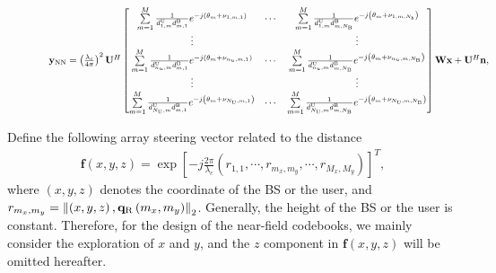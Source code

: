 \documentclass[lettersize, journal]{IEEEtran}
\begin{document}
\begin{figure*}[!b]
\hrulefill
\begin{equation}\label{y_NN}
\begin{array}{l}
{\bf{y}}_{{\rm{NN}}} =\left( \frac{ \lambda_c}{4\pi} \right)^2 {\bf{U}}^H
\begin{bmatrix}
\sum\limits_{m = 1}^{M} \frac{1}{ d_{1, m}^{\rm{U}}d_{m, 1}^{\rm{B}} } e^{ -j\left( \theta_m + \nu_{1, m, 1} \right) } & \cdots & \sum\limits_{m = 1}^{M} \frac{1}{ d_{1, m}^{\rm{U}}d_{m, N_{\rm{B}}}^{\rm{B}} } e^{ -j\left( \theta_m + \nu_{1, m, N_b} \right) }  \\
  \vdots &  & \vdots \\
\sum\limits_{m = 1}^{M} \frac{1}{ d_{n_u, m}^{\rm{U}}d_{m, 1}^{\rm{B}} } e^{ -j\left( \theta_m + \nu_{n_u, m, 1} \right) } & \cdots & \sum\limits_{m = 1}^{M} \frac{1}{ d_{n_u, m}^{\rm{U}}d_{m, N_{\rm{B}}}^{\rm{B}} } e^{ -j\left( \theta_m + \nu_{n_u, m, N_{\rm{B}}} \right) } \\
  \vdots &  & \vdots \\
\sum\limits_{m = 1}^{M} \frac{1}{ d_{N_{\rm{U}}, m}^{\rm{U}}d_{m, 1}^{\rm{B}} } e^{ -j\left( \theta_m + \nu_{N_{\rm{U}}, m, 1} \right) } & \cdots & \sum\limits_{m = 1}^{M} \frac{1}{ d_{N_{\rm{U}}, m}^{\rm{U}}d_{m, N_{\rm{B}}}^{\rm{B}} } e^{ -j\left( \theta_m + \nu_{N_{\rm{U}}, m, N_{\rm{B}}} \right) } \end{bmatrix} 
 {\bf{W}} {\bf{x}}  + {\bf{U}}^H{\bf{n}},
\end{array}
\end{equation}
\end{figure*}


Define the following array steering vector related to the distance 
\begin{equation}\label{steering_d}
\begin{array}{l}
{\bm{f}}\left( x, y, z \right) = \exp \left[ -j\frac{{2\pi }}{{\lambda_c }} \left( r_{1, 1}, \cdots, r_{m_x, m_y}, \cdots, r_{M_x, M_y}\right) \right]^T , 
\end{array}
\end{equation}
where 
$ \left( x, y, z \right)$ denotes the coordinate of the BS or the user, and $r_{m_x, m_y} = \left \| \left( x, y, z \right),  {\bf{q}}_{\rm{R}}\left( m_x, m_y \right) \right \|_2$.
Generally, the height of the BS or the user is constant.
Therefore, for the design of the near-field codebooks, we mainly consider the exploration of $x$ and $y$, and the $z$ component in ${\bm{f}}\left( x, y, z \right)$ will be omitted hereafter.
\end{document}
